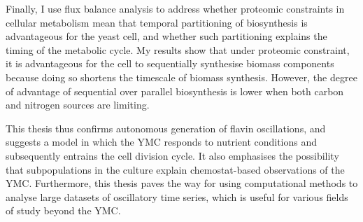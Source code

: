 {  Finally, I use flux balance analysis to address whether proteomic constraints in cellular metabolism mean that temporal partitioning of biosynthesis is advantageous for the yeast cell, and whether such partitioning explains the timing of the metabolic cycle.
  My results show that under proteomic constraint, it is advantageous for the cell to sequentially synthesise biomass components because doing so shortens the timescale of biomass synthesis.
  However, the degree of advantage of sequential over parallel biosynthesis is lower when both carbon and nitrogen sources are limiting.

  This thesis thus confirms autonomous generation of flavin oscillations, and suggests a model in which the YMC responds to nutrient conditions and subsequently entrains the cell division cycle.
  It also emphasises the possibility that subpopulations in the culture explain chemostat-based observations of the YMC.
  Furthermore, this thesis paves the way for using computational methods to analyse large datasets of oscillatory time series, which is useful for various fields of study beyond the YMC.
}


